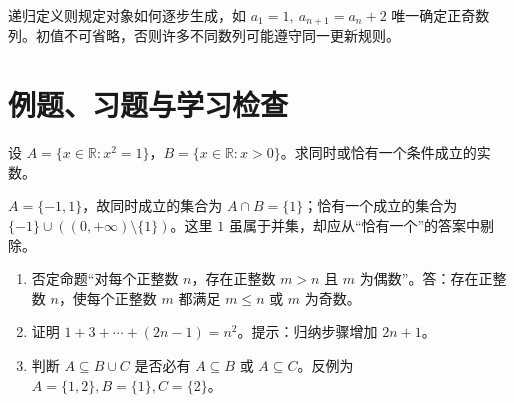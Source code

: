 递归定义则规定对象如何逐步生成，如 $a_1=1,\ a_{n+1}=a_n+2$ 唯一确定正奇数列。初值不可省略，否则许多不同数列可能遵守同一更新规则。

\section{例题、习题与学习检查}
\begin{example}
设 $A=\{x\in\mathbb R:x^2=1\}$，$B=\{x\in\mathbb R:x>0\}$。求同时或恰有一个条件成立的实数。
\end{example}
\begin{solve}
$A=\{-1,1\}$，故同时成立的集合为 $A\cap B=\{1\}$；恰有一个成立的集合为 $\{-1\}\cup((0,+\infty)\setminus\{1\})$。这里 $1$ 虽属于并集，却应从“恰有一个”的答案中剔除。
\end{solve}
\begin{enumerate}
\item 否定命题“对每个正整数 $n$，存在正整数 $m>n$ 且 $m$ 为偶数”。答：存在正整数 $n$，使每个正整数 $m$ 都满足 $m\le n$ 或 $m$ 为奇数。
\item 证明 $1+3+\cdots+(2n-1)=n^2$。提示：归纳步骤增加 $2n+1$。
\item 判断 $A\subseteq B\cup C$ 是否必有 $A\subseteq B$ 或 $A\subseteq C$。反例为 $A=\{1,2\},B=\{1\},C=\{2\}$。
\end{enumerate}

